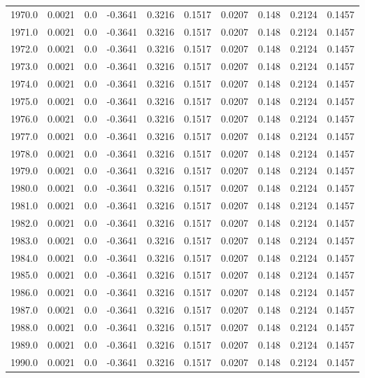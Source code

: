 \begin{longtable}{lrrrrrrrrr}
1970.0 & 0.0021 & 0.0 & -0.3641 & 0.3216 & 0.1517 & 0.0207 & 0.148 & 0.2124 & 0.1457 \\
1971.0 & 0.0021 & 0.0 & -0.3641 & 0.3216 & 0.1517 & 0.0207 & 0.148 & 0.2124 & 0.1457 \\
1972.0 & 0.0021 & 0.0 & -0.3641 & 0.3216 & 0.1517 & 0.0207 & 0.148 & 0.2124 & 0.1457 \\
1973.0 & 0.0021 & 0.0 & -0.3641 & 0.3216 & 0.1517 & 0.0207 & 0.148 & 0.2124 & 0.1457 \\
1974.0 & 0.0021 & 0.0 & -0.3641 & 0.3216 & 0.1517 & 0.0207 & 0.148 & 0.2124 & 0.1457 \\
1975.0 & 0.0021 & 0.0 & -0.3641 & 0.3216 & 0.1517 & 0.0207 & 0.148 & 0.2124 & 0.1457 \\
1976.0 & 0.0021 & 0.0 & -0.3641 & 0.3216 & 0.1517 & 0.0207 & 0.148 & 0.2124 & 0.1457 \\
1977.0 & 0.0021 & 0.0 & -0.3641 & 0.3216 & 0.1517 & 0.0207 & 0.148 & 0.2124 & 0.1457 \\
1978.0 & 0.0021 & 0.0 & -0.3641 & 0.3216 & 0.1517 & 0.0207 & 0.148 & 0.2124 & 0.1457 \\
1979.0 & 0.0021 & 0.0 & -0.3641 & 0.3216 & 0.1517 & 0.0207 & 0.148 & 0.2124 & 0.1457 \\
1980.0 & 0.0021 & 0.0 & -0.3641 & 0.3216 & 0.1517 & 0.0207 & 0.148 & 0.2124 & 0.1457 \\
1981.0 & 0.0021 & 0.0 & -0.3641 & 0.3216 & 0.1517 & 0.0207 & 0.148 & 0.2124 & 0.1457 \\
1982.0 & 0.0021 & 0.0 & -0.3641 & 0.3216 & 0.1517 & 0.0207 & 0.148 & 0.2124 & 0.1457 \\
1983.0 & 0.0021 & 0.0 & -0.3641 & 0.3216 & 0.1517 & 0.0207 & 0.148 & 0.2124 & 0.1457 \\
1984.0 & 0.0021 & 0.0 & -0.3641 & 0.3216 & 0.1517 & 0.0207 & 0.148 & 0.2124 & 0.1457 \\
1985.0 & 0.0021 & 0.0 & -0.3641 & 0.3216 & 0.1517 & 0.0207 & 0.148 & 0.2124 & 0.1457 \\
1986.0 & 0.0021 & 0.0 & -0.3641 & 0.3216 & 0.1517 & 0.0207 & 0.148 & 0.2124 & 0.1457 \\
1987.0 & 0.0021 & 0.0 & -0.3641 & 0.3216 & 0.1517 & 0.0207 & 0.148 & 0.2124 & 0.1457 \\
1988.0 & 0.0021 & 0.0 & -0.3641 & 0.3216 & 0.1517 & 0.0207 & 0.148 & 0.2124 & 0.1457 \\
1989.0 & 0.0021 & 0.0 & -0.3641 & 0.3216 & 0.1517 & 0.0207 & 0.148 & 0.2124 & 0.1457 \\
1990.0 & 0.0021 & 0.0 & -0.3641 & 0.3216 & 0.1517 & 0.0207 & 0.148 & 0.2124 & 0.1457 \\

\end{longtable}
